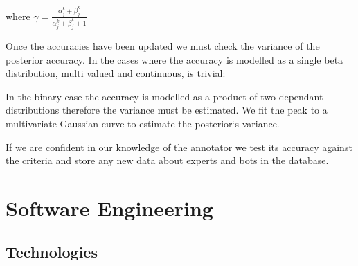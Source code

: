 \documentclass[11pt]{article}
\begin{document}
where $\gamma = \frac{\alpha_{j}^{k} + \beta_{j}^{k}}{\alpha_{j}^{k} + \beta_{j}^{k} + 1}$ 

Once the accuracies have been updated we must check the variance of the posterior accuracy. In the cases where the accuracy is modelled as a single beta distribution, multi valued and continuous, is trivial:

In the binary case the accuracy is modelled as a product of two dependant distributions therefore the variance must be estimated. We fit the peak to a multivariate Gaussian curve to estimate the posterior`s variance.

If we are confident in our knowledge of the annotator we test its accuracy against the criteria and store any new data about experts and bots in the database.\\

 
 
\section{Software Engineering}
\subsection{Technologies}
\end{document}
